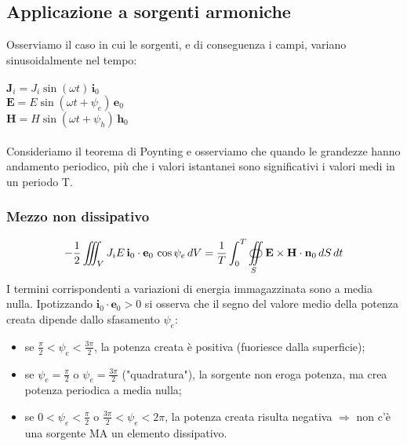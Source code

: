\documentclass[a4paper]{article}
\let\oldoiint\oiint
\renewcommand{\oiint}{\oldoiint\limits}
\begin{document}
\subsection*{Applicazione a sorgenti armoniche}
Osserviamo il caso in cui le sorgenti, e di conseguenza i campi, variano sinusoidalmente nel tempo:\\\\
\hspace*{40mm}$\textbf{J}_i=J_i\sin(\omega t)\,\textbf{i}_0$\\
\hspace*{40mm}$\textbf{E}=E\sin(\omega t+\psi_e)\,\textbf{e}_0$\\
\hspace*{40mm}$\textbf{H}=H\sin(\omega t+\psi_h)\,\textbf{h}_0$\\\\
Consideriamo il teorema di Poynting e osserviamo che quando le grandezze hanno andamento periodico, più che i valori istantanei sono significativi i valori medi in un periodo T.
\subsubsection*{Mezzo non dissipativo}
\begin{equation*}
-\frac{1}{2}\iiint_{V}J_iE\,\textbf{i}_0\cdot\textbf{e}_0\,\cos\psi_e\,dV=\frac{1}{T}\int_0^T\oiint_{S}\textbf{E}\times\textbf{H}\cdot\textbf{n}_0\,dS\,dt\\
\end{equation*}
I termini corrispondenti a variazioni di energia immagazzinata sono a media nulla. Ipotizzando $\textbf{i}_0\cdot\textbf{e}_0>0$ si osserva che il segno del valore medio della potenza creata dipende dallo sfasamento $\psi_e$:
\begin{itemize}
\item se $\frac{\pi}{2}<\psi_e<\frac{3\pi}{2}$, la potenza creata è positiva (fuoriesce dalla superficie);
\item se $\psi_e=\frac{\pi}{2}$ o $\psi_e=\frac{3\pi}{2}$ ("quadratura"), la sorgente non eroga potenza, ma crea potenza periodica a media nulla;
\item se $0<\psi_e<\frac{\pi}{2}$ o $\frac{3\pi}{2}<\psi_e<2\pi$, la potenza creata risulta negativa $\Rightarrow$ non c'è una sorgente MA un elemento dissipativo.
\end{itemize}
\end{document}
